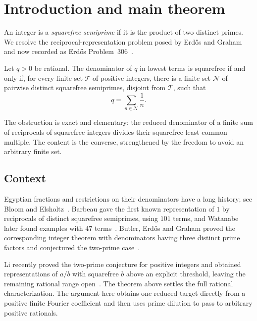 \section{Introduction and main theorem}
\label{sec:introduction}

An integer is a \emph{squarefree semiprime} if it is the product of two distinct primes. We resolve the reciprocal-representation problem posed by Erd\H{o}s and Graham~\cite{erdos-graham-1980} and now recorded as Erd\H{o}s Problem~306~\cite{erdos-problem-306}.

\begin{theorem}
\label{thm:main}
Let $q>0$ be rational. The denominator of $q$ in lowest terms is squarefree if and only if, for every finite set $\mathcal T$ of positive integers, there is a finite set $\mathcal N$ of pairwise distinct squarefree semiprimes, disjoint from $\mathcal T$, such that
\[
 q=\sum_{n\in\mathcal N}\frac1n.
\]
\end{theorem}

The obstruction is exact and elementary: the reduced denominator of a finite sum of reciprocals of squarefree integers divides their squarefree least common multiple. The content is the converse, strengthened by the freedom to avoid an arbitrary finite set.

\subsection{Context}

Egyptian fractions and restrictions on their denominators have a long history; see Bloom and Elsholtz~\cite{bloom-elsholtz-2022}. Barbeau gave the first known representation of $1$ by reciprocals of distinct squarefree semiprimes, using $101$ terms, and Watanabe later found examples with $47$ terms~\cite{barbeau-1977,watanabe-2020}. Butler, Erd\H{o}s and Graham proved the corresponding integer theorem with denominators having three distinct prime factors and conjectured the two-prime case~\cite{butler-erdos-graham-2015}.

Li recently proved the two-prime conjecture for positive integers and obtained representations of $a/b$ with squarefree $b$ above an explicit threshold, leaving the remaining rational range open~\cite{li-2026-semiprime}. The theorem above settles the full rational characterization. The argument here obtains one reduced target directly from a positive finite Fourier coefficient and then uses prime dilution to pass to arbitrary positive rationals.

